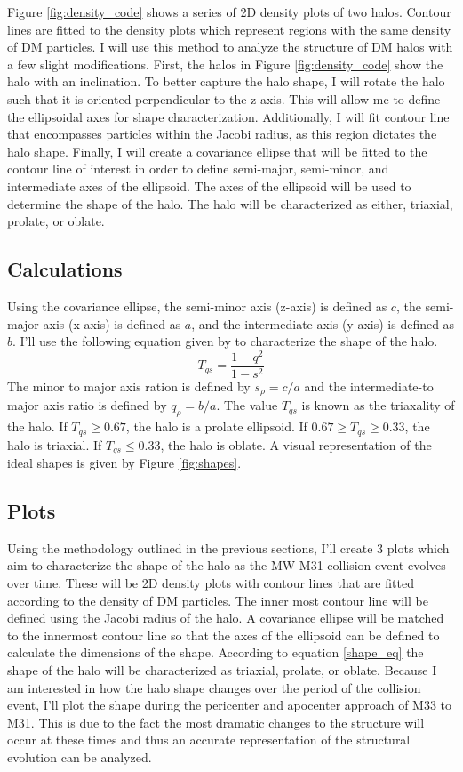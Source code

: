 \documentclass[usenatbib]{mnras}
\begin{document}
Figure \ref{fig:density_code} shows a series of 2D density plots of two halos. Contour lines are fitted to the density plots which represent regions with the same density of DM particles. I will use this method to analyze the structure of DM halos with a few slight modifications. First, the halos in Figure \ref{fig:density_code} show the halo with an inclination. To better capture the halo shape, I will rotate the halo such that it is oriented perpendicular to the z-axis. This will allow me to define the ellipsoidal axes for shape characterization. Additionally, I will fit contour line that encompasses particles within the Jacobi radius, as this region dictates the halo shape. Finally, I will create a covariance ellipse that will be fitted to the contour line of interest in order to define semi-major, semi-minor, and intermediate axes of the ellipsoid. The axes of the ellipsoid will be used to determine the shape of the halo. The halo will be characterized as either, triaxial, prolate, or oblate.
\subsection{Calculations}
Using the covariance ellipse, the semi-minor axis (z-axis) is defined as $c$, the semi-major axis (x-axis) is defined as $a$, and the intermediate axis (y-axis) is defined as $b$. I'll use the following equation given by \cite{Garavito-Camargo_2021} to characterize the shape of the halo.
\begin{equation} \label{shape_eq}
    T_{qs} = \frac{1-q^2}{1-s^2}
\end{equation}
The minor to major axis ration is defined by $s_\rho = c/a$ and the intermediate-to major axis ratio is defined by $q_\rho = b/a$. The value $T_{qs}$ is known as the triaxality of the halo. If $T_{qs} \ge 0.67$, the halo is a prolate ellipsoid. If $0.67 \ge T_{qs} \ge 0.33$, the halo is triaxial. If $T_{qs} \le 0.33$, the halo is oblate. A visual representation of the ideal shapes is given by Figure \ref{fig:shapes}.

\subsection{Plots}
Using the methodology outlined in the previous sections, I'll create 3 plots which aim to characterize the shape of the halo as the MW-M31 collision event evolves over time. These will be 2D density plots with contour lines that are fitted according to the density of DM particles. The inner most contour line will be defined using the Jacobi radius of the halo. A covariance ellipse will be matched to the innermost contour line so that the axes of the ellipsoid can be defined to calculate the dimensions of the shape. According to equation \ref{shape_eq} the shape of the halo will be characterized as triaxial, prolate, or oblate. Because I am interested in how the halo shape changes over the period of the collision event, I'll plot the shape during the pericenter and apocenter approach of M33 to M31. This is due to the fact the most dramatic changes to the structure will occur at these times and thus an accurate representation of the structural evolution can be analyzed. 
\end{document}
